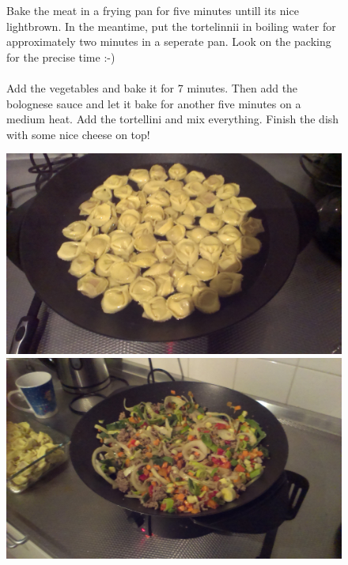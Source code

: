 \documentclass[a4paper,12pt]{report}
\begin{document}
\begin{figure}[h]

\begin{minipage}{0.6\textwidth}
Bake the meat in a frying pan for five minutes untill its nice lightbrown. In the meantime, put the tortelinnii in boiling water for approximately two minutes in a seperate pan. Look on the packing for the precise time :-)  \\
\\
Add the vegetables and bake it for 7 minutes. Then add the bolognese sauce and let it bake for another five minutes on a medium heat. Add the tortellini and mix everything. Finish the dish with some nice cheese on top!

\end{minipage}
\begin{minipage}{0.35\textwidth}
	\includegraphics[scale=0.065]{Images/tor.jpg}
	\includegraphics[scale=0.065]{Images/end.jpg}
\end{minipage}
\end{figure}
\end{document}
